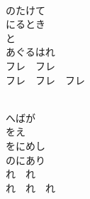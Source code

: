 \documentclass[10pt,b5j]{tarticle} %
\begin{document}
\vspace{1.5em} %
\newcommand{\linespace}{0.5em} %
\newcommand{\blocksize}{0.5\hsize} %
\newcommand{\itemmargin}{3em} %
\begin{enumerate} %
    \setlength{\itemindent}{\itemmargin} %
    \begin{minipage}[c]{\blocksize}
    
        \vspace{\linespace}
        \item~\\
        のたけて\\
        にるとき\\
        と\\
        あぐるはれ\\
        フレ　フレ\\
        フレ　フレ　フレ
        
    \end{minipage}
    \begin{minipage}[c]{\blocksize}
        
        \vspace{\linespace}
        \item~\\
        へばが\\
        をえ\\
        をにめし\\
        のにあり\\
        れ　れ\\
        れ　れ　れ
        
    \end{minipage}
    \begin{minipage}[c]{\blocksize}
        

\end{minipage}
\end{enumerate}
\end{document}
